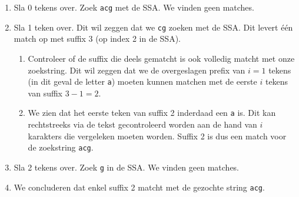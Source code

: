 \begin{enumerate}
    \item Sla 0 tekens over.
    Zoek \texttt{acg} met de SSA\@.
    We vinden geen matches.
    \item Sla 1 teken over.
    Dit wil zeggen dat we \texttt{cg} zoeken met de SSA\@.
    Dit levert één match op met suffix 3 (op index 2 in de SSA).
    \begin{enumerate}
        \item Controleer of de suffix die deels gematcht is ook volledig matcht met onze zoekstring.
        Dit wil zeggen dat we de overgeslagen prefix van $i = 1$ tekens (in dit geval de letter \texttt{a}) moeten kunnen matchen met de eerste $i$ tekens van suffix $3 - 1 = 2$.
        \item We zien dat het eerste teken van suffix 2 inderdaad een \texttt{a} is.
        Dit kan rechtstreeks via de tekst gecontroleerd worden aan de hand van $i$ karakters die vergeleken moeten worden.
        Suffix 2 is dus een match voor de zoekstring \texttt{acg}.
    \end{enumerate}
    \item Sla 2 tekens over.
    Zoek \texttt{g} in de SSA\@.
    We vinden geen matches.
    \item We concluderen dat enkel suffix 2 matcht met de gezochte string \texttt{acg}.
\end{enumerate}

